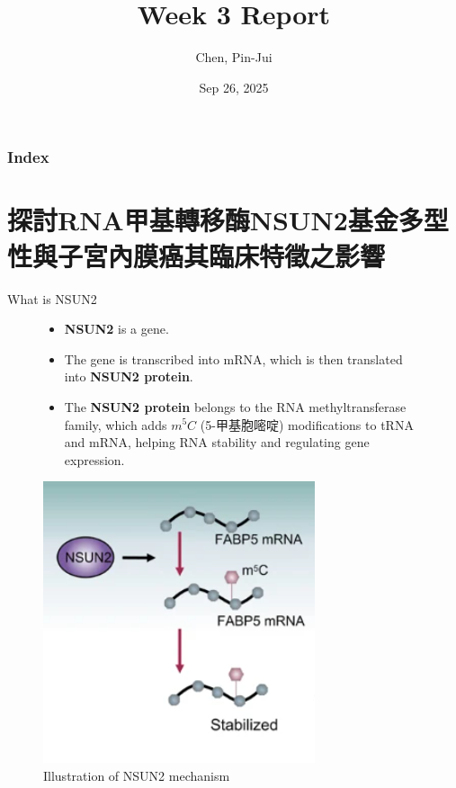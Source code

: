 \documentclass[12pt, aspectratio=43]{beamer}
\title[\textbf{Week 3 Report}]{Week 3 Report}
\author[Chen, Pin-Jui]{Chen, Pin-Jui}
\date[Sep 26, 2025]{Sep 26, 2025}
\begin{document}
\begin{frame}
  \titlepage
\end{frame}

\begin{frame}
  \frametitle{Index}
  \tableofcontents
\end{frame}

\section{探討RNA甲基轉移酶NSUN2基金多型性與子宮內膜癌其臨床特徵之影響}
\begin{frame}{What is NSUN2}
    \begin{figure}[h!]
        \centering
        \begin{minipage}{0.6\textwidth}
            \begin{itemize}
                \item \textbf{NSUN2} is a gene.
                \item The gene is transcribed into mRNA, which is then translated into \textbf{NSUN2 protein}.
                \item The \textbf{NSUN2 protein} belongs to the RNA methyltransferase family, which adds $m^5C$ (5-甲基胞嘧啶) modifications to tRNA and mRNA, helping RNA stability and regulating gene expression.
            \end{itemize}
        \end{minipage}\hfill
        \begin{minipage}{0.35\textwidth}
            \centering
            \includegraphics[width=\linewidth]{Figure/NSUN2.png}
            \caption[NSUN2 mechanism]{Illustration of NSUN2 mechanism\cite{Yang2023}}
        \end{minipage}
    \end{figure}
\end{frame}
\end{document}
